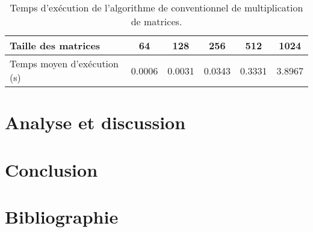 \documentclass[a4paper, 12pt]{article} %
\begin{document}
\begin{table}[H]
    \caption{Temps d'exécution de l'algorithme de conventionnel de multiplication de matrices.}
    \centering
    \begin{tabular}{| l | c | c | c | c | c |}
    \hline
    Taille des matrices & 64 & 128 & 256 & 512 & 1024 \\
    \hline  
    Temps moyen d'exécution (s) & 0.0006 & 0.0031 & 0.0343 & 0.3331 & 3.8967 \\
    \hline  
    \end{tabular}
\end{table}

\section{Analyse et discussion}

\section{Conclusion}

\section{Bibliographie}
\end{document}
